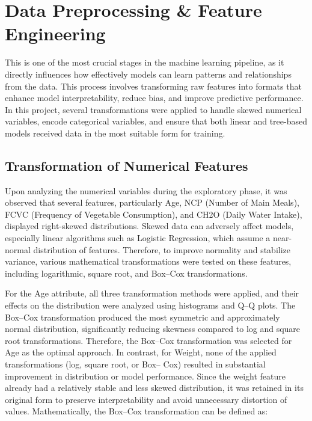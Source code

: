 \chapter{Data Preprocessing & Feature Engineering}\label{ch:feature-engineering}


This is one of the most crucial stages in the machine learning pipeline, as it directly influences how effectively models can learn patterns and relationships from the data.
This process involves transforming raw features into formats that enhance model interpretability, reduce bias, and improve predictive performance.
In this project, several transformations were applied to handle skewed numerical variables, encode categorical variables, and ensure that both linear and tree-based models received data in the most suitable form for training.



\section{Transformation of Numerical Features}\label{sec:transformation-of-numerical-features}

Upon analyzing the numerical variables during the exploratory phase, it was observed that several features, particularly Age, NCP (Number of Main Meals), FCVC (Frequency of Vegetable Consumption), and CH2O (Daily Water Intake), displayed right-skewed distributions.
Skewed data can adversely affect models, especially linear algorithms such as Logistic Regression, which assume a near-normal distribution of features.
Therefore, to improve normality and stabilize variance, various mathematical transformations were tested on these features, including logarithmic, square root, and Box–Cox transformations.

For the Age attribute, all three transformation methods were applied, and their effects on the distribution were analyzed using histograms and Q–Q plots.
The Box–Cox transformation produced the most symmetric and approximately normal distribution, significantly reducing skewness compared to log and square root transformations.
Therefore, the Box–Cox transformation was selected for Age as the optimal approach.
In contrast, for Weight, none of the applied transformations (log, square root, or Box– Cox) resulted in substantial improvement in distribution or model performance.
Since the weight feature already had a relatively stable and less skewed distribution, it was retained in its original form to preserve interpretability and avoid unnecessary distortion of values.
Mathematically, the Box–Cox transformation can be defined as:

